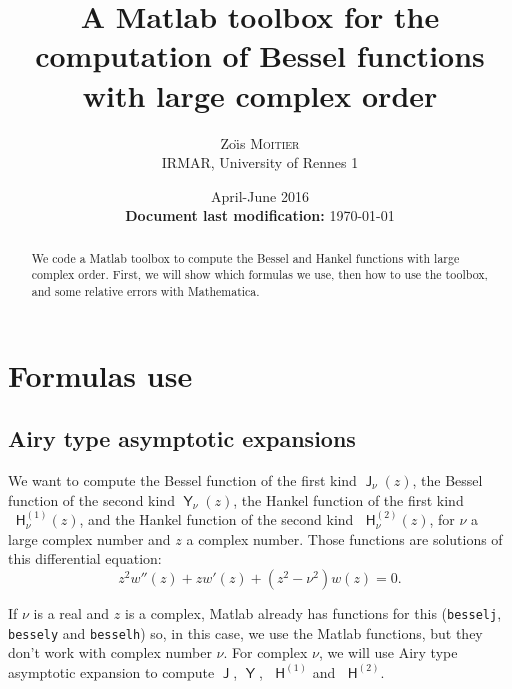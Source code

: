 \documentclass[12pt,a4paper]{article}
\title{A Matlab toolbox for the computation of Bessel
functions with large complex order}
\author{
    Zo{\"\i}s \textsc{Moitier}\\
    IRMAR, University of Rennes 1
}
\date{
    April-June 2016\\
    \bigskip\small
    \textbf{Document last modification:} \today
}
\numberwithin{equation}{section}
\DeclareMathOperator{\bJ}{\mathsf{J}}
\DeclareMathOperator{\bY}{\mathsf{Y}}
\newcommand{\hO}{\mathop{}\!\mathsf{H}^{(1)}}
\newcommand{\hT}{\mathop{}\!\mathsf{H}^{(2)}}
\theoremstyle{definition}
\theoremstyle{plain}
\theoremstyle{remark}
\begin{document}
\maketitle

\begin{abstract}
    We code a Matlab toolbox to compute the Bessel and Hankel functions with large complex order.
    First, we will show which formulas we use, then how to use the toolbox, and some relative errors with Mathematica.
\end{abstract}

\tableofcontents

\section{Formulas use}

\subsection{Airy type asymptotic expansions}

We want to compute the Bessel function of the first kind \( \bJ_\nu(z) \), the Bessel function of the second kind \( \bY_\nu(z) \), the Hankel function of the first kind \( \hO_\nu(z) \), and the Hankel function of the second kind \( \hT_\nu(z) \), for \( \nu \) a large complex number and \( z \) a complex number.
Those functions are solutions of this differential equation:
\[
    z^2 w''(z) + z w'(z) + (z^2-\nu^2) w(z) = 0.
\]

If \( \nu \) is a real and \( z \) is a complex, Matlab already has functions for this (\texttt{besselj}, \texttt{bessely} and \texttt{besselh}) so, in this case, we use the Matlab functions, but they don't work with complex number \( \nu \).
For complex \( \nu \), we will use Airy type asymptotic expansion to compute \( \bJ \), \( \bY \), \( \hO \) and \( \hT \).
\end{document}

